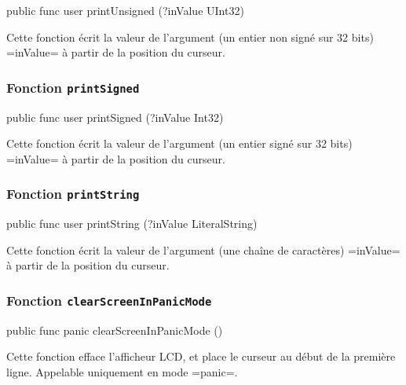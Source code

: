 \begin{OMNIBUS}
  public func user printUnsigned (?inValue UInt32)
\end{OMNIBUS}

Cette fonction écrit la valeur de l'argument (un entier non signé sur 32 bits) \omnibus=inValue= à partir de la position du curseur.






\subsubsection{Fonction \texttt{printSigned}}

\begin{OMNIBUS}
  public func user printSigned (?inValue Int32)
\end{OMNIBUS}

Cette fonction écrit la valeur de l'argument (un entier signé sur 32 bits) \omnibus=inValue= à partir de la position du curseur.







\subsubsection{Fonction \texttt{printString}}

\begin{OMNIBUS}
  public func user printString (?inValue LiteralString)
\end{OMNIBUS}

Cette fonction écrit la valeur de l'argument (une chaîne de caractères) \omnibus=inValue= à partir de la position du curseur.









\subsubsection{Fonction \texttt{clearScreenInPanicMode}}

\begin{OMNIBUS}
  public func panic clearScreenInPanicMode ()
\end{OMNIBUS}

Cette fonction efface l'afficheur LCD, et place le curseur au début de la première ligne. Appelable uniquement en mode \omnibus=panic=.





